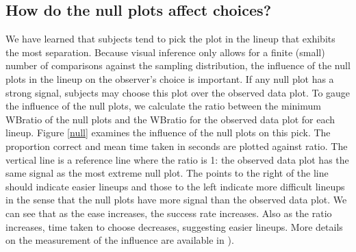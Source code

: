 \subsection{How do the null plots affect choices?}

We have learned that subjects tend to pick the plot in the lineup that exhibits the most separation.  Because visual inference only allows for a finite (small) number of comparisons against the sampling distribution, the influence of the null plots in the lineup on the observer's choice is important. If any null plot has a strong signal, subjects may choose this plot over the observed data plot. To gauge the influence of the null plots, we calculate the ratio between the minimum WBratio of the null plots and the WBratio for the observed data plot for each lineup. Figure \ref{null} examines the influence of the null plots on this pick. The proportion correct and mean time taken in seconds are plotted against ratio. The vertical line is a reference line where the ratio is 1: the observed data plot has the same signal as the most extreme null plot. The points to the right of the line should indicate easier lineups and those to the left indicate more difficult lineups in the sense that the null plots have more signal than the observed data plot. We can see that as the ease increases, the success rate increases. Also as the ratio increases, time taken to choose decreases, suggesting easier lineups. More details on the measurement of the influence are available in \cite{roychowdhury:2012}).

